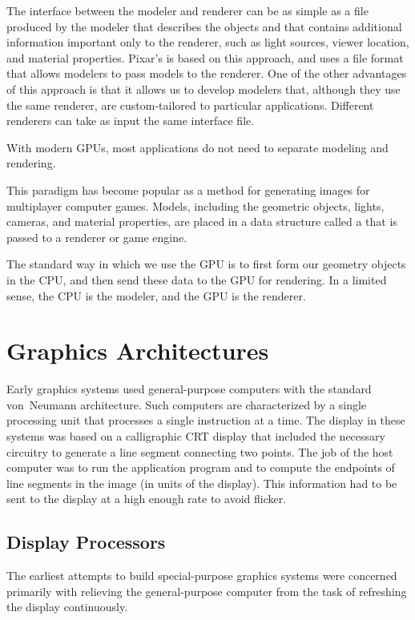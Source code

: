 \documentclass[../COS3712_Notes.tex]{subfiles}
\begin{document}
        The interface between the modeler and renderer can be
        as simple as a file produced by the modeler that describes the objects
        and that contains additional information important only to the renderer,
        such as light sources, viewer location, and material properties.
        Pixar's  is based on this approach,
        and uses a file format that allows modelers to pass models to the renderer.
        One of the other advantages of this approach is that
        it allows us to develop modelers that,
        although they use the same renderer,
        are custom-tailored to particular applications.
        Different renderers can take as input the same interface file.

        With modern GPUs, most applications do not need to separate modeling and rendering.

        This paradigm has become popular as a method
        for generating images for multiplayer computer games.
        Models, including the geometric objects, lights, cameras, and material properties,
        are placed in a data structure called a 
        that is passed to a renderer or game engine.

        The standard way in which we use the GPU is to
        first form our geometry objects in the CPU,
        and then send these data to the GPU for rendering.
        In a limited sense, the CPU is the modeler, and the GPU is the renderer.

    \section{Graphics Architectures}
      Early graphics systems used general-purpose computers
      with the standard von~Neumann architecture.
      Such computers are characterized by a single processing unit
      that processes a single instruction at a time.
      The display in these systems was based on a calligraphic CRT display
      that included the necessary circuitry to generate a line segment
      connecting two points.
      The job of the host computer was to run the application program
      and to compute the endpoints of line segments in the image
      (in units of the display).
      This information had to be sent to the display at a high enough rate
      to avoid flicker.

      \subsection{Display Processors}
        The earliest attempts to build special-purpose graphics systems
        were concerned primarily with relieving the general-purpose computer
        from the task of refreshing the display continuously.
\end{document}
